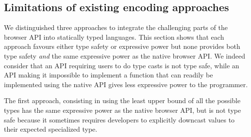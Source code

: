 \documentclass{llncs}
\newcommand{\jscode}[1]{\lstinline[language=JavaScript]|#1|}
\begin{document}
% 

\subsection{Limitations of existing encoding approaches}
\label{sec-limitations}

We distinguished three approaches to integrate the challenging parts of the browser API into statically typed languages. This section shows that each approach favours either type safety or expressive power but none provides both type safety \emph{and} the same expressive power as the native browser API. We indeed  consider that an API requiring users to do type casts is not type safe, while an API making it impossible to implement a function that can readily be implemented using the native API gives less expressive power to the programmer.

The first approach, consisting in using the least upper bound of all the possible types has the same expressive power as the native browser API, but is not type safe because it sometimes requires developers to explicitly downcast values to their expected specialized type.
\end{document}
